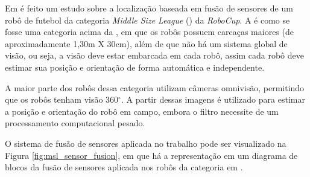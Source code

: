 \documentclass[acronym, symbols, table]{fei}
\begin{document}
%	
	
	Em \textcite{ismail2022soccer} é feito um estudo sobre a localização baseada em fusão de sensores de um robô de futebol da categoria \textit{Middle Size League} () da \textit{RoboCup}. A  é como se fosse uma categoria acima da , em que os robôs possuem carcaças maiores (de aproximadamente 1,30m X 30cm), além de que não há um sistema global de visão, ou seja, a visão deve estar embarcada em cada robô, assim cada robô deve estimar sua posição e orientação de forma automática e independente.
	
	A maior parte dos robôs dessa categoria utilizam câmeras omnivisão, permitindo que os robôs tenham visão 360$^\circ$. A partir dessas imagens é utilizado  para estimar a posição e orientação do robô em campo, embora o filtro necessite de um processamento computacional pesado.
	
	O sistema de fusão de sensores aplicada no trabalho pode ser visualizado na Figura \ref{fig:msl_sensor_fusion}, em que há a representação em um diagrama de blocos da fusão de sensores aplicada nos robôs da categoria  em \textcite{ismail2022soccer}.
	
\end{document}

